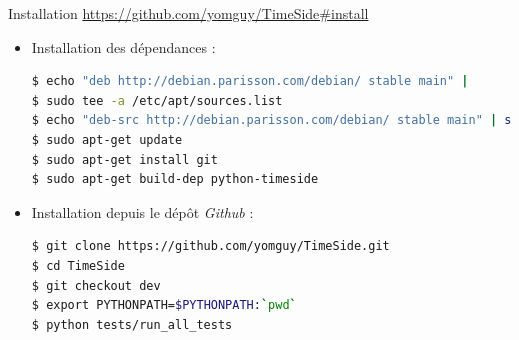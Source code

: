 \documentclass[10pt, final, hyperref, table]{beamer}
\begin{document}
\begin{frame}[fragile]
  \begin{block}{Installation}
\url{https://github.com/yomguy/TimeSide\#install}
    \begin{itemize}
    \item Installation des dépendances :
\begin{lstlisting}[language=bash, basicstyle=\tiny]
$ echo "deb http://debian.parisson.com/debian/ stable main" |
$ sudo tee -a /etc/apt/sources.list 
$ echo "deb-src http://debian.parisson.com/debian/ stable main" | sudo tee -a /etc/apt/sources.list 
$ sudo apt-get update 
$ sudo apt-get install git 
$ sudo apt-get build-dep python-timeside
\end{lstlisting}

    \item Installation depuis le dépôt \emph{Github} :
\begin{lstlisting}[language=bash, basicstyle=\tiny]
$ git clone https://github.com/yomguy/TimeSide.git 
$ cd TimeSide 
$ git checkout dev 
$ export PYTHONPATH=$PYTHONPATH:`pwd` 
$ python tests/run_all_tests
\end{lstlisting}
\end{itemize}
\end{block}
\end{frame}
\end{document}
